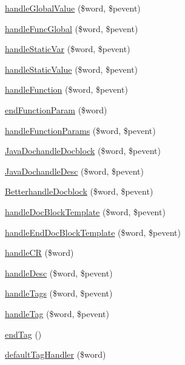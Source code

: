 \begin{DoxyCompactItemize}
\item 
\hyperlink{class_parser_a0ccd4322dd89809afc72a800e4137ee4}{handle\-Global\-Value} (\$word, \$pevent)
\item 
\hyperlink{class_parser_aeea50ac4c19702902041fa4c7886efdd}{handle\-Func\-Global} (\$word, \$pevent)
\item 
\hyperlink{class_parser_a001679854479b7f7ef2b9d2f8ee1c1ed}{handle\-Static\-Var} (\$word, \$pevent)
\item 
\hyperlink{class_parser_a0388cdf67fc4bd4a046528d22e246bb4}{handle\-Static\-Value} (\$word, \$pevent)
\item 
\hyperlink{class_parser_a6dc39d8d613058ad93f476e91fdb7cf3}{handle\-Function} (\$word, \$pevent)
\item 
\hyperlink{class_parser_a1bf75b45723f236dc492dd5e1d9bebaf}{end\-Function\-Param} (\$word)
\item 
\hyperlink{class_parser_aabdf4a71f7610ba56a173ea10c5f541b}{handle\-Function\-Params} (\$word, \$pevent)
\item 
\hyperlink{class_parser_a8621e54d2f0eda7024fe6dafcd1ce6a8}{\-Java\-Dochandle\-Docblock} (\$word, \$pevent)
\item 
\hyperlink{class_parser_a1e875d919b06fb6cf98e0263da231b17}{\-Java\-Dochandle\-Desc} (\$word, \$pevent)
\item 
\hyperlink{class_parser_a3cba80a427ccf0dcfffbca92945ba747}{\-Betterhandle\-Docblock} (\$word, \$pevent)
\item 
\hyperlink{class_parser_a160e719efdd469b417661e1e9daa8506}{handle\-Doc\-Block\-Template} (\$word, \$pevent)
\item 
\hyperlink{class_parser_a8e569462d6bc2b240593860a646ddaaf}{handle\-End\-Doc\-Block\-Template} (\$word, \$pevent)
\item 
\hyperlink{class_parser_a8f31de72b93444366492b63622e618b1}{handle\-C\-R} (\$word)
\item 
\hyperlink{class_parser_afeb7f64a40dff7ffc2744827c724379b}{handle\-Desc} (\$word, \$pevent)
\item 
\hyperlink{class_parser_ae746cffb6fa16000468607041f7f4692}{handle\-Tags} (\$word, \$pevent)
\item 
\hyperlink{class_parser_a04c9d956763b0f5c797a3c75f6aee07b}{handle\-Tag} (\$word, \$pevent)
\item 
\hyperlink{class_parser_a29b592ca857bb2309aa66779f6facc82}{end\-Tag} ()
\item 
\hyperlink{class_parser_a0cd5c47a97494555289cdf513dfa9fd1}{default\-Tag\-Handler} (\$word)
\item 

\end{DoxyCompactItemize}
